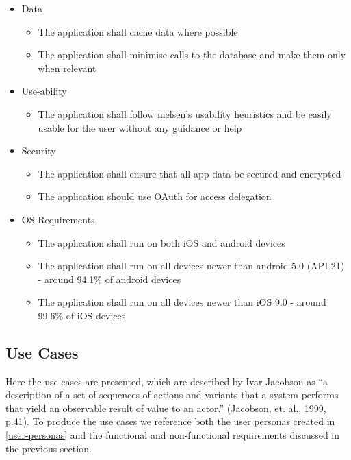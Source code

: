 \documentclass[12pt]{article}
\begin{document}
	\begin{itemize}
	\item Data
	\begin{itemize}
		\item The application shall cache data where possible
		\item The application shall minimise calls to the database and make them only when relevant
	\end{itemize}
	\end{itemize}

	\begin{itemize}
		\item Use-ability
		\begin{itemize}
			\item The application shall follow nielsen's usability heuristics and be easily usable for the user without any guidance or help
		\end{itemize}
	\end{itemize}

	\begin{itemize}
		\item Security
		\begin{itemize}
			\item The application shall ensure that all app data be secured and encrypted
			\item The application should use OAuth for access delegation
		\end{itemize}
	\end{itemize}

	\begin{itemize}
		\item OS Requirements
		\begin{itemize}
			\item The application shall run on both iOS and android devices
			\item The application shall run on all devices newer than android 5.0 (API 21) - around 94.1\% of android devices
			\item The application shall run on all devices newer than iOS 9.0 - around 99.6\% of iOS devices
		\end{itemize}
	\end{itemize}
	
	\subsection{Use Cases}
	Here the use cases are presented, which are described by Ivar Jacobson as “a description of a set of sequences of actions and variants that a system performs that yield an observable result of value to an actor.” (Jacobson, et. al., 1999, p.41). To produce the use cases we reference both the user personas created in \autoref{user-personas} and the functional and non-functional requirements discussed in the previous section.
	
\end{document}
